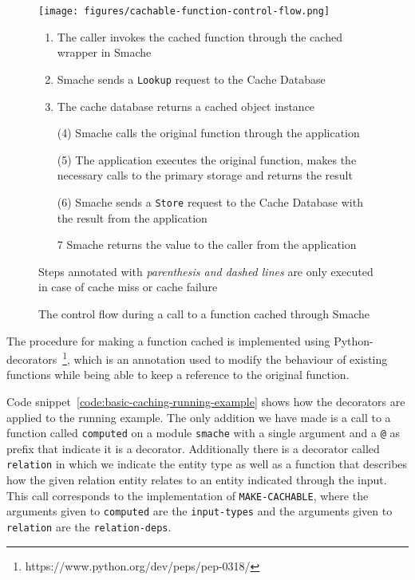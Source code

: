 \begin{figure*}[ht!]
  \begin{center}
    \texttt{[image: figures/cachable-function-control-flow.png]}
  \end{center}
  \begin{enumerate}
    \item The caller invokes the cached function through the cached wrapper in Smache
    \item Smache sends a \verb$Lookup$ request to the Cache Database
    \item The cache database returns a cached object instance
    \item[(4)] Smache calls the original function through the application
    \item[(5)] The application executes the original function, makes the necessary calls to the primary storage and returns the result
    \item[(6)] Smache sends a \verb$Store$ request to the Cache Database with the result from the application
    \item[7] Smache returns the value to the caller from the application
  \end{enumerate}
  \footnotesize{Steps annotated with \emph{parenthesis and dashed lines} are only executed in case of cache miss or cache failure}
  \caption{The control flow during a call to a function cached through Smache}
  \label{fig:cachable-function-control-flow}
\end{figure*}

The procedure for making a function cached is implemented using Python-decorators~\footnote{https://www.python.org/dev/peps/pep-0318/}, which is an annotation used to modify the behaviour of existing functions while being able to keep a reference to the original function.

Code snippet~\ref{code:basic-caching-running-example} shows how the decorators are applied to the running example. The only addition we have made is a call to a function called \verb$computed$ on a module \verb$smache$ with a single argument and a \verb$@$ as prefix that indicate it is a decorator. Additionally there is a decorator called \verb$relation$ in which we indicate the entity type as well as a function that describes how the given relation entity relates to an entity indicated through the input. This call corresponds to the implementation of \verb$MAKE-CACHABLE$, where the arguments given to \verb$computed$ are the \verb$input-types$ and the arguments given to \verb$relation$ are the \verb$relation-deps$.

